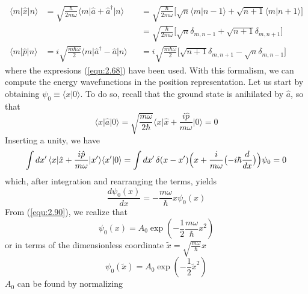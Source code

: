 \begin{subequations}
  \begin{alignat}{3}
    \langle m\vert \hat{x}\vert n\rangle  &= \sqrt{\frac{\hbar}{2m\omega}}
    \langle m\vert \hat{a}+ \hat{a}^{\dagger}\vert n\rangle  &&=
    \sqrt{\frac{\hbar}{2m\omega}} 
    \bigl[\sqrt{n}\langle m\vert n-1\rangle  + \sqrt{n+1}\langle m\vert n+1\rangle \bigr]
    \nonumber \\
    &{}&&= \sqrt{\frac{\hbar}{2m\omega}}
    \bigl[\sqrt{n}\delta_{m , n-1} + \sqrt{n+1}\delta_{m,
    n+1}\bigr] \label{equ:2.87a} \\
    \langle m\vert \hat{p}\vert n\rangle  &= i \sqrt{\frac{m\hbar \omega}{2}}
    \langle m\vert \hat{a}^{\dagger} - \hat{a}\vert n\rangle  &&= i
    \sqrt{\frac{m\hbar\omega}{2}}
    \bigl[
      \sqrt{n+1}\delta_{m,n+1} - \sqrt{n}\delta_{m,n-1}
    \bigr]\label{equ:2.87b}
  \end{alignat}
\end{subequations}
where the expresions (\ref{equ:2.68}) have been used.
With this formalism, we can compute the energy wavefunctions
in the position representation. Let us start by obtaining
$\psi_0 \equiv \langle x\vert 0\rangle $. To do so, recall that the ground
state is anihilated by $\hat{a}$, so that
\begin{equation}
  \langle x\vert \hat{a}\vert 0\rangle  = \sqrt{\frac{m\omega}{2\hbar}} \langle x\vert \hat{x}+
  \frac{i\hat{p}}{m\omega} \vert 0\rangle  = 0
  \label{equ:2.88}
\end{equation}
Inserting a unity, we have
\begin{equation}
  \int dx' \, \langle x\vert \hat{x} + \frac{i\hat{p}}{m\omega}\vert x'\rangle 
  \langle x'\vert 0\rangle  =
  \int dx' \, \delta(x - x')
  \Bigl(x + \frac{i}{m\omega}\bigl(-i\hbar
  \frac{d}{dx}\bigr)\Bigr)\psi_0 = 0
  \label{equ:2.89}
\end{equation}
which, after integration and rearranging the terms, yields
\begin{equation}
  \frac{d\psi_0(x)}{dx} = -\frac{m\omega}{\hbar} x \psi_0(x)
  \label{equ:2.90}
\end{equation}
From (\ref{equ:2.90}), we realize that
$$
\psi_0(x) = A_0 \exp(-\frac{1}{2}\frac{m\omega}{\hbar}x^2)
$$
or in terms of the dimensionless coordinate $\tilde{x} =
\sqrt{\frac{m\omega}{\hbar}}x$
\begin{equation}
  \psi_0(\tilde{x}) = A_0 \exp(-\frac{1}{2}\tilde{x}^2)
  \label{equ:2.91}
\end{equation}
$A_0$ can be found by normalizing
